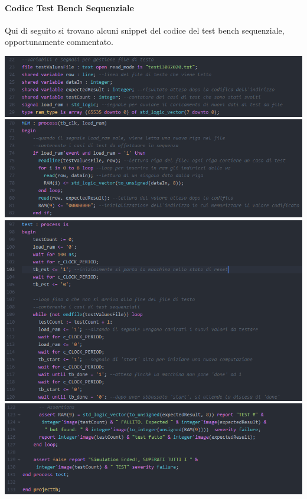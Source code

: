 \documentclass{article}
\begin{document}
\paragraph{Codice Test Bench Sequenziale}
%
Qui di seguito si trovano alcuni snippet del codice del test bench sequenziale, opportunamente commentato.
\begin{flushleft}
\includegraphics[scale=0.75]{sequential1} \\
\includegraphics[scale=0.75]{sequential2} \\
\includegraphics[scale=0.75]{sequential3} \\
\includegraphics[scale=0.75]{sequential4} \\
\end{flushleft}
\end{document}

